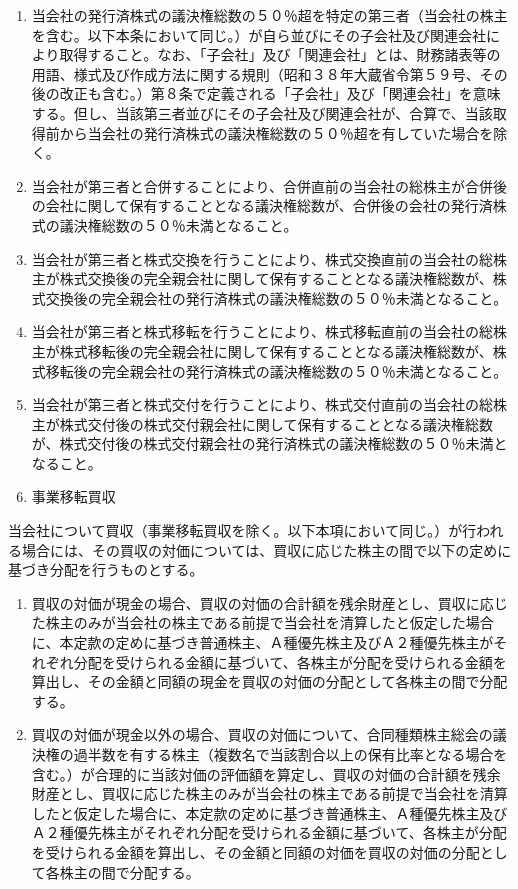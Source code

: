 \documentclass[10pt,a4paper,uplatex]{jsarticle}
\begin{document}
\begin{enumerate}
\item 当会社の発行済株式の議決権総数の５０％超を特定の第三者（当会社の株主を含む。以下本条において同じ。）が自ら並びにその子会社及び関連会社により取得すること。なお、「子会社」及び「関連会社」とは、財務諸表等の用語、様式及び作成方法に関する規則（昭和３８年大蔵省令第５９号、その後の改正も含む。）第８条で定義される「子会社」及び「関連会社」を意味する。但し、当該第三者並びにその子会社及び関連会社が、合算で、当該取得前から当会社の発行済株式の議決権総数の５０％超を有していた場合を除く。
\item 当会社が第三者と合併することにより、合併直前の当会社の総株主が合併後の会社に関して保有することとなる議決権総数が、合併後の会社の発行済株式の議決権総数の５０％未満となること。
\item 当会社が第三者と株式交換を行うことにより、株式交換直前の当会社の総株主が株式交換後の完全親会社に関して保有することとなる議決権総数が、株式交換後の完全親会社の発行済株式の議決権総数の５０％未満となること。
\item 当会社が第三者と株式移転を行うことにより、株式移転直前の当会社の総株主が株式移転後の完全親会社に関して保有することとなる議決権総数が、株式移転後の完全親会社の発行済株式の議決権総数の５０％未満となること。
\item 当会社が第三者と株式交付を行うことにより、株式交付直前の当会社の総株主が株式交付後の株式交付親会社に関して保有することとなる議決権総数が、株式交付後の株式交付親会社の発行済株式の議決権総数の５０％未満となること。
\item 事業移転買収
\end{enumerate}
\term 当会社について買収（事業移転買収を除く。以下本項において同じ。）が行われる場合には、その買収の対価については、買収に応じた株主の間で以下の定めに基づき分配を行うものとする。
\begin{enumerate}
\item 買収の対価が現金の場合、買収の対価の合計額を残余財産とし、買収に応じた株主のみが当会社の株主である前提で当会社を清算したと仮定した場合に、本定款の定めに基づき普通株主、Ａ種優先株主及びＡ２種優先株主がそれぞれ分配を受けられる金額に基づいて、各株主が分配を受けられる金額を算出し、その金額と同額の現金を買収の対価の分配として各株主の間で分配する。
\item 買収の対価が現金以外の場合、買収の対価について、合同種類株主総会の議決権の過半数を有する株主（複数名で当該割合以上の保有比率となる場合を含む。）が合理的に当該対価の評価額を算定し、買収の対価の合計額を残余財産とし、買収に応じた株主のみが当会社の株主である前提で当会社を清算したと仮定した場合に、本定款の定めに基づき普通株主、Ａ種優先株主及びＡ２種優先株主がそれぞれ分配を受けられる金額に基づいて、各株主が分配を受けられる金額を算出し、その金額と同額の対価を買収の対価の分配として各株主の間で分配する。
\end{enumerate}
\end{document}
